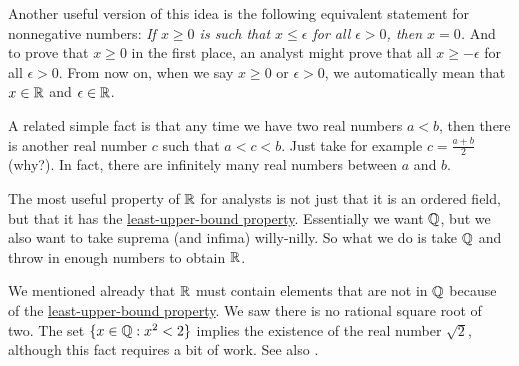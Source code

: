 Another useful version of this idea is the following equivalent
statement for nonnegative numbers: \emph{If $x \geq 0$ is such that $x \leq \epsilon$ for all
$\epsilon > 0$, then $x = 0$.}
And to prove that $x \geq 0$ in the first place, an analyst might prove
that all $x \geq -\epsilon$ for all $\epsilon > 0$.
From now on, when we say $x \geq 0$ or
$\epsilon > 0$, we automatically mean that $x \in {\mathbb{R}}$ and $\epsilon \in {\mathbb{R}}$.

A related simple fact is that 
any time we have two real numbers $a < b$, then there is another
real number $c$ such that
$a < c < b$.  Just take for example $c = \frac{a+b}{2}$ (why?).  In fact,
there are infinitely many real numbers between $a$ and $b$.

The most useful property of ${\mathbb{R}}$ for analysts
is not just that it is an ordered field, but that it has the
\hyperref[defn:lub]{least-upper-bound property}.  Essentially we want ${\mathbb{Q}}$, but we also
want to take suprema (and infima) willy-nilly.  So what we do is 
take ${\mathbb{Q}}$ and
throw in enough numbers to obtain ${\mathbb{R}}$.



We mentioned already that ${\mathbb{R}}$ must contain elements that are not in ${\mathbb{Q}}$
because of the \hyperref[defn:lub]{least-upper-bound property}.
We saw there is no
rational square root of two.  The set
$\{ x \in {\mathbb{Q}} : x^2 < 2 \}$ implies the existence of the real number
$\sqrt{2}$, although this fact requires a bit of work.  See also
.

